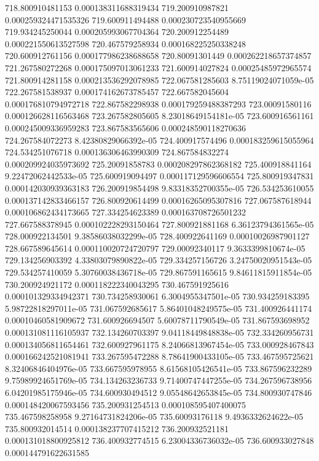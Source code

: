 {718.800910481153 0.000138311688319434
719.200910987821 0.000259324471535326
719.600911494488 0.000230723540955669
719.934245250044 0.000205993067704364
720.200912254489 0.000221550613527598
720.467579258934 0.000168225250338248
720.600912761156 0.000177986238688658
720.80091301449 0.000262218657374857
721.267580272268 0.000175097013061233
721.600914027824 0.00025485972965574
721.800914281158 0.000213536292078985
722.067581285603 8.75119024071059e-05
722.267581538937 0.000174162673785457
722.667582045604 0.000176810794972718
722.867582298938 0.000179259488387293
723.00091580116 0.000126628116563468
723.267582805605 8.23018649154181e-05
723.600916561161 0.000245009336959283
723.867583565606 0.000248590118270636
724.267584072273 8.42380829066392e-05
724.400917574496 0.000183259615055964
724.534251076718 0.000136306463990309
724.867584832274 0.000209924035973692
725.20091858783 0.000208297862368182
725.400918841164 9.22472062442533e-05
725.600919094497 0.000117129596606554
725.800919347831 0.000142030939363183
726.200919854498 9.83318352700355e-05
726.534253610055 0.000137142833466157
726.800920614499 0.00016265095307816
727.067587618944 0.000106862434173665
727.334254623389 0.000163708726501232
727.667588378945 0.000102228293150464
727.800921881168 6.36123794361565e-05
728.000922134501 9.38586038032299e-05
728.400922641169 0.00010026987901127
728.667589645614 0.000110020724720797
729.00092340117 9.3633399810674e-05
729.134256903392 4.33803079890822e-05
729.334257156726 3.24750020951543e-05
729.534257410059 5.30760038436718e-05
729.867591165615 9.84611815911854e-05
730.200924921172 0.000118222340043295
730.467591925616 0.000101329334942371
730.734258930061 6.3004955347501e-05
730.934259183395 5.98722818297011e-05
731.067592685617 5.86401048249575e-05
731.400926441174 0.00010460581909672
731.600926694507 5.60078711790549e-05
731.867593698952 0.000131081116105937
732.134260703397 9.04118449848838e-05
732.334260956731 0.000134056811654461
732.600927961175 8.24066813967454e-05
733.000928467843 0.000166242521081941
733.267595472288 8.78641900433105e-05
733.467595725621 8.32406846404976e-05
733.667595978955 8.61568105426541e-05
733.867596232289 9.75989924651769e-05
734.134263236733 9.71400747447255e-05
734.267596738956 6.04201985175946e-05
734.600930494512 9.05548642653845e-05
734.800930747846 0.000148420067593456
735.200931254513 0.000108595407400075
735.467598258958 9.27164731824206e-05
735.60093176118 9.4936332624622e-05
735.800932014514 0.000138237707415212
736.200932521181 0.000131018800925812
736.400932774515 6.23004336736032e-05
736.600933027848 0.000144791622631585
}
